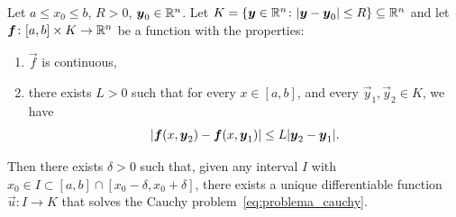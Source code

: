 \begin{theorem}%
  \label{th:cauchy_lipschitz}%
Let $a\le x_0 \le b$, $R>0$, $\boldsymbol y_0 \in {\mathbb R}^n$. Let $K={\left\{ \boldsymbol y\in
{\mathbb R}^n \colon {\left|\boldsymbol y - \boldsymbol y_0\right|}\le R \right\}}\subseteq {\mathbb R}^n$ and let $\boldsymbol f\colon
[a,b]\times K\to {\mathbb R}^n$ be a function with the properties:
\begin{enumerate}
  \item $\vec f$ is continuous,
  \item there exists $L>0$ such that for every $x\in [a,b]$, and every $\vec y_1,\vec y_2 \in K$, we have 
  \begin{equation}\label{eq:hp_lipschitz}
  {\left|\boldsymbol f(x, \boldsymbol y_2) - \boldsymbol f(x,\boldsymbol y_1)\right|} \le L {\left|\boldsymbol y_2- \boldsymbol y_1\right|}.  
  \end{equation}
\end{enumerate}

Then there exists $\delta>0$ such that, given any interval $I$ with $x_0 \in I
\subset [a,b]\cap [x_0-\delta, x_0+\delta]$, there exists a unique
differentiable function $\vec u\colon I \to K$ that solves the Cauchy
problem~\eqref{eq:problema_cauchy}.
\end{theorem}
%
